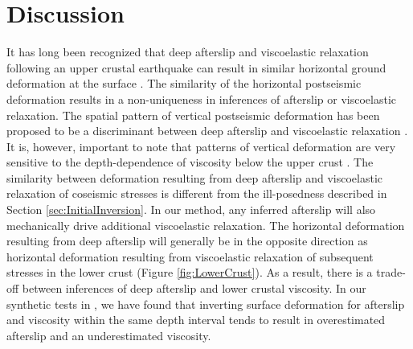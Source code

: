 \documentclass[draft,linenumbers]{AGUJournal}
\begin{document}
\section{Discussion}\label{Discussion}
It has long been recognized that deep afterslip and viscoelastic relaxation following an upper crustal earthquake can result in similar horizontal ground deformation at the surface \citep[e.g.][]{Savage1990, Pollitz2001, Hearn2003, Feigl2006}. The similarity of the horizontal postseismic deformation results in a non-uniqueness in inferences of afterslip or viscoelastic relaxation.  The spatial pattern of vertical postseismic deformation has been proposed to be a discriminant between deep afterslip and viscoelastic relaxation \citep[e.g.][]{Pollitz2001, Hearn2003}. It is, however, important to note that patterns of vertical deformation are very sensitive to the depth-dependence of viscosity below the upper crust \citep{Yang1981,Hetland2014}.  The similarity between deformation resulting from deep afterslip and viscoelastic relaxation of coseismic stresses is different from the ill-posedness described in Section \ref{sec:InitialInversion}. In our method, any inferred afterslip will also mechanically drive additional viscoelastic relaxation.  The horizontal deformation resulting from deep afterslip will generally be in the opposite direction as horizontal deformation resulting from viscoelastic relaxation of subsequent stresses in the lower crust (Figure \ref{fig:LowerCrust}).  As a result, there is a trade-off between inferences of deep afterslip and lower crustal viscosity.  In our synthetic tests in \citet{Hines2016}, we have found that inverting surface deformation for afterslip and viscosity within the same depth interval tends to result in overestimated afterslip and an underestimated viscosity.
\end{document}
